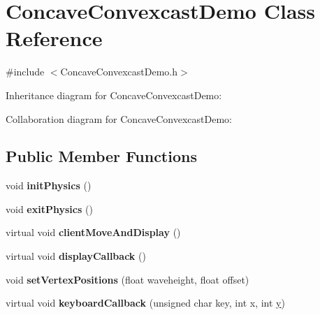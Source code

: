 \hypertarget{class_concave_convexcast_demo}{\section{Concave\+Convexcast\+Demo Class Reference}
\label{class_concave_convexcast_demo}
}


{\ttfamily \#include $<$Concave\+Convexcast\+Demo.\+h$>$}



Inheritance diagram for Concave\+Convexcast\+Demo\+:


Collaboration diagram for Concave\+Convexcast\+Demo\+:
\subsection*{Public Member Functions}
\begin{DoxyCompactItemize}
\item 
\hypertarget{class_concave_convexcast_demo_a81e653d39850e4a737a64a1f5f7be4ce}{void {\bfseries init\+Physics} ()}\label{class_concave_convexcast_demo_a81e653d39850e4a737a64a1f5f7be4ce}

\item 
\hypertarget{class_concave_convexcast_demo_a0a00c9f52c9411cb62e19ea561134871}{void {\bfseries exit\+Physics} ()}\label{class_concave_convexcast_demo_a0a00c9f52c9411cb62e19ea561134871}

\item 
\hypertarget{class_concave_convexcast_demo_a6b5e5a1e508d0da2e57d19961130a84b}{virtual void {\bfseries client\+Move\+And\+Display} ()}\label{class_concave_convexcast_demo_a6b5e5a1e508d0da2e57d19961130a84b}

\item 
\hypertarget{class_concave_convexcast_demo_aa1413e2ed9f6e7670fdea59410eaed46}{virtual void {\bfseries display\+Callback} ()}\label{class_concave_convexcast_demo_aa1413e2ed9f6e7670fdea59410eaed46}

\item 
\hypertarget{class_concave_convexcast_demo_a69a9a730f6199d4dbe0aeed781810cef}{void {\bfseries set\+Vertex\+Positions} (float waveheight, float offset)}\label{class_concave_convexcast_demo_a69a9a730f6199d4dbe0aeed781810cef}

\item 
\hypertarget{class_concave_convexcast_demo_a33cdc0eebd9994d22bf714d07ab30c49}{virtual void {\bfseries keyboard\+Callback} (unsigned char key, int x, int \hyperlink{_ice_utils_8h_aa7ffaed69623192258fb8679569ff9ba}{y})}\label{class_concave_convexcast_demo_a33cdc0eebd9994d22bf714d07ab30c49}

\end{DoxyCompactItemize}
